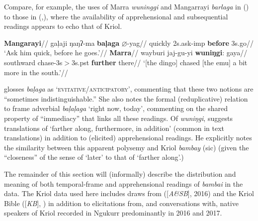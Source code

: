 \documentclass[11pt]{article}
\begin{document}
 Compare, for example, the uses of Marra \textit{wuninggi} and Mangarrayi \textit{barlaga} in  (\nextx) to those in (,), where the availability of apprehensional and subsequential readings appears to echo that of Kriol.

\pex\a\begingl\glpreamble\textbf{Mangarayi}//
\gla gaḷaji ŋaŋʔ-ma \textbf{baḷaga} $\varnothing$-yag//
\glb quickly 2s.ask-\gls{imp} \textbf{before} 3s.go//
\glft`Ask him quick, before he goes.'//\endgl
\a\begingl\glpreamble\textbf{Marra}//
\gla wayburi jaj-gu-yi \textbf{wuniŋgi}: gaya//
\glb southward chase-3s$\scriptscriptstyle>$3s.\gls{pst} \textbf{further} there//
\glft`[the dingo] chased [the emu] a bit more in the south.'//\endgl\xe

\citet[147]{Merlan1989} glosses \textit{baḷaga} as `\textsc{evitative/anticipatory}', commenting  that these two notions are ``sometimes indistinguishable.'' She also notes the formal (reduplicative) relation to frame adverbial \textit{baḷaḷaga} `right now, today', commenting on the shared property of ``immediacy'' that links all these readings. Of \textit{wuniŋgi}, \citet[308]{Heath1981} suggests translations of `farther along, furthermore, in addition' (common in text translations) in addition to (elicited) apprehensional readings. He explicitly notes the similarity between this apparent polysemy and Kriol \textit{bambay} (sic) (given the ``closeness'' of the sense of `later' to that of `farther along'.)


The remainder of this section will (informally) describe the distribution and meaning of both temporal-frame and apprehensional readings of \textit{bambai} in the data.  The Kriol data used here includes draws from \citeauthor{Angelo2016} ([\textit{A\&SB}], 2016) and the Kriol Bible ([\textit{KB}], \citealp{BibleSocAust}) in addition to elicitations from, and conversations with, native speakers of Kriol recorded in Ngukurr predominantly in 2016 and 2017. 
\end{document}
